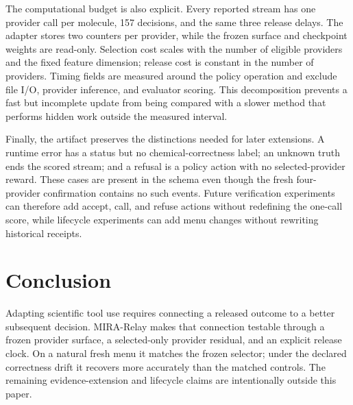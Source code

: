 \documentclass[sigconf,anonymous]{aamas}
\begin{document}
The computational budget is also explicit. Every reported stream has one provider call per molecule, 157 decisions, and the same three release delays. The adapter stores two counters per provider, while the frozen surface and checkpoint weights are read-only. Selection cost scales with the number of eligible providers and the fixed feature dimension; release cost is constant in the number of providers. Timing fields are measured around the policy operation and exclude file I/O, provider inference, and evaluator scoring. This decomposition prevents a fast but incomplete update from being compared with a slower method that performs hidden work outside the measured interval.

Finally, the artifact preserves the distinctions needed for later extensions. A runtime error has a status but no chemical-correctness label; an unknown truth ends the scored stream; and a refusal is a policy action with no selected-provider reward. These cases are present in the schema even though the fresh four-provider confirmation contains no such events. Future verification experiments can therefore add accept, call, and refuse actions without redefining the one-call score, while lifecycle experiments can add menu changes without rewriting historical receipts.

\section{Conclusion}
Adapting scientific tool use requires connecting a released outcome to a better subsequent decision. MIRA-Relay makes that connection testable through a frozen provider surface, a selected-only provider residual, and an explicit release clock. On a natural fresh menu it matches the frozen selector; under the declared correctness drift it recovers more accurately than the matched controls. The remaining evidence-extension and lifecycle claims are intentionally outside this paper.

\clearpage
\balance


\end{document}
